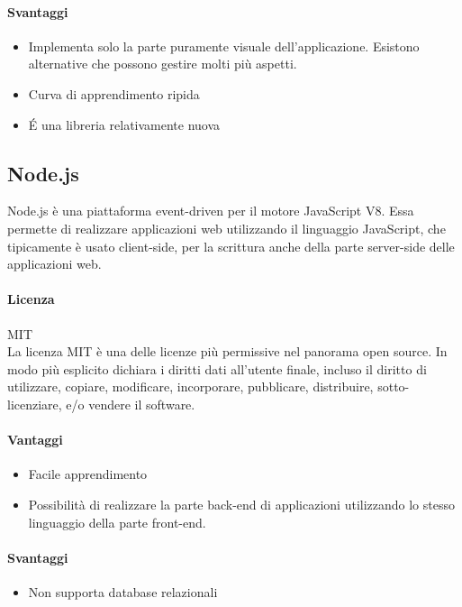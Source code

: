 \paragraph{Svantaggi} 
\begin{itemize}
	\item Implementa solo la parte puramente visuale
     dell'applicazione. Esistono alternative che possono gestire molti
     più aspetti.
	\item Curva di apprendimento ripida
	\item \'E una libreria relativamente nuova
\end{itemize}

\subsection{Node.js}

Node.js è una piattaforma event-driven per il motore JavaScript
V8. Essa permette di realizzare applicazioni web utilizzando il
linguaggio JavaScript, che tipicamente è usato client-side, per la scrittura anche
della parte server-side delle applicazioni web. 
\\
\paragraph{Licenza} MIT \\
La licenza MIT è una delle licenze più permissive nel panorama open
source. In modo più esplicito dichiara i diritti dati all'utente
finale, incluso il diritto di utilizzare, copiare, modificare,
incorporare, pubblicare, distribuire, sotto-licenziare, e/o vendere il
software. \\

\paragraph{Vantaggi}
\begin{itemize}
	\item Facile apprendimento
	\item Possibilità di realizzare la parte back-end di applicazioni utilizzando lo stesso linguaggio della parte front-end.
\end{itemize}

\paragraph{Svantaggi} 
\begin{itemize}
	\item Non supporta database relazionali
	
\end{itemize}

